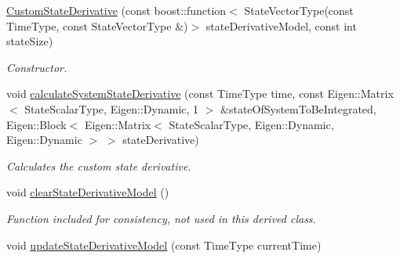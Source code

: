 \begin{DoxyCompactItemize}
\item 
\hyperlink{classtudat_1_1propagators_1_1CustomStateDerivative_aaf3a0c6e7421e646a65420a58813b24a}{Custom\+State\+Derivative} (const boost\+::function$<$ State\+Vector\+Type(const Time\+Type, const State\+Vector\+Type \&)$>$ state\+Derivative\+Model, const int state\+Size)
\begin{DoxyCompactList}\small\item\em Constructor. \end{DoxyCompactList}\item 
void \hyperlink{classtudat_1_1propagators_1_1CustomStateDerivative_afdf99d87ec97710ebf94b58785c33378}{calculate\+System\+State\+Derivative} (const Time\+Type time, const Eigen\+::\+Matrix$<$ State\+Scalar\+Type, Eigen\+::\+Dynamic, 1 $>$ \&state\+Of\+System\+To\+Be\+Integrated, Eigen\+::\+Block$<$ Eigen\+::\+Matrix$<$ State\+Scalar\+Type, Eigen\+::\+Dynamic, Eigen\+::\+Dynamic $>$ $>$ state\+Derivative)
\begin{DoxyCompactList}\small\item\em Calculates the custom state derivative. \end{DoxyCompactList}\item 
void \hyperlink{classtudat_1_1propagators_1_1CustomStateDerivative_a7b2ebdcc6f42cfb1cbb46291d6e80ffe}{clear\+State\+Derivative\+Model} ()\hypertarget{classtudat_1_1propagators_1_1CustomStateDerivative_a7b2ebdcc6f42cfb1cbb46291d6e80ffe}{}\label{classtudat_1_1propagators_1_1CustomStateDerivative_a7b2ebdcc6f42cfb1cbb46291d6e80ffe}

\begin{DoxyCompactList}\small\item\em Function included for consistency, not used in this derived class. \end{DoxyCompactList}\item 
void \hyperlink{classtudat_1_1propagators_1_1CustomStateDerivative_ae23ee87ceb17b4d8e2ce8e14ac65028b}{update\+State\+Derivative\+Model} (const Time\+Type current\+Time)\hypertarget{classtudat_1_1propagators_1_1CustomStateDerivative_ae23ee87ceb17b4d8e2ce8e14ac65028b}{}\label{classtudat_1_1propagators_1_1CustomStateDerivative_ae23ee87ceb17b4d8e2ce8e14ac65028b}


\end{DoxyCompactItemize}

